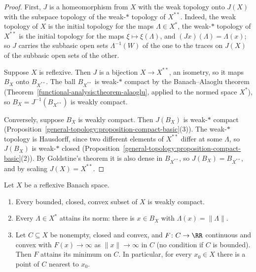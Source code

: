 \begin{proof}
First, $J$ is a homeomorphism from $X$ with the weak topology onto $J(X)$ with the subspace topology of the weak-$*$ topology of $X^{**}$. Indeed, the weak topology of $X$ is the initial topology for
the maps $\Lambda \in X^*$, the weak-$*$ topology of $X^{**}$ is the initial topology for the maps $\xi \mapsto \xi(\Lambda)$, and $(J x)(\Lambda) = \Lambda(x)$; so $J$ carries the subbasic open sets
$\Lambda^{-1}(W)$ of the one to the traces on $J(X)$ of the subbasic open sets of the other.

Suppose $X$ is reflexive. Then $J$ is a bijection $X \to X^{**}$, an isometry, so it maps $B_X$ onto $B_{X^{**}}$. The ball $B_{X^{**}}$ is weak-$*$ compact by the Banach--Alaoglu theorem
(Theorem~\ref{functional-analysis:theorem-alaoglu}, applied to the normed space $X^*$), so $B_X = J^{-1}(B_{X^{**}})$ is weakly compact.

Conversely, suppose $B_X$ is weakly compact. Then $J(B_X)$ is weak-$*$ compact (Proposition~\ref{general-topology:proposition-compact-basic}(3)). The weak-$*$ topology is Hausdorff, since two different
elements of $X^{**}$ differ at some $\Lambda$, so $J(B_X)$ is weak-$*$ closed (Proposition~\ref{general-topology:proposition-compact-basic}(2)). By Goldstine's theorem it is also dense in $B_{X^{**}}$, so
$J(B_X) = B_{X^{**}}$, and by scaling $J(X) = X^{**}$.
\end{proof}

\begin{corollary}\label{functional-analysis:corollary-reflexive-minimisation}
Let $X$ be a reflexive Banach space.
\begin{enumerate}
\item Every bounded, closed, convex subset of $X$ is weakly compact.
\item Every $\Lambda \in X^*$ attains its norm: there is $x \in B_X$ with $\Lambda(x) = \|\Lambda\|$.
\item Let $C \subseteq X$ be nonempty, closed and convex, and $F \colon C \to \RR$ continuous and convex with $F(x) \to \infty$ as $\|x\| \to \infty$ in $C$ (no condition if $C$ is bounded). Then $F$ attains its
minimum on $C$. In particular, for every $x_0 \in X$ there is a point of $C$ nearest to $x_0$.
\end{enumerate}
\end{corollary}


